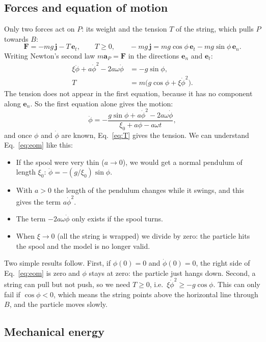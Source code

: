 \documentclass[11pt,a4paper]{article}
\newcommand{\dt}[1]{\dot{#1}}
\newcommand{\ddt}[1]{\ddot{#1}}
\newcommand{\en}{\bm{e}_n}
\newcommand{\et}{\bm{e}_t}
\begin{document}
\subsection{Forces and equation of motion}
Only two forces act on $P$: its weight and the tension $T$ of the string, which pulls $P$ towards $B$:
\begin{equation}
\bm F=-mg\,\bm j-T\,\et,\qquad T\geq0,\qquad -mg\,\bm j=mg\cos\phi\,\et-mg\sin\phi\,\en .
\label{eq:forces}
\end{equation}
Writing Newton's second law $m\bm a_P=\bm F$ in the directions $\en$ and $\et$:
\begin{align}
\xi\ddot{\phi}+a\dt{\phi}^{2}-2a\omega\dt{\phi}&=-g\sin\phi ,\label{eq:eomn}\\
T&=m\big(g\cos\phi+\xi\dt{\phi}^{2}\big).\label{eq:T}
\end{align}
The tension does not appear in the first equation, because it has no component along $\en$. So the first equation alone gives the motion:
\begin{equation}
\ddot{\phi}=-\frac{g\sin\phi+a\dt{\phi}^{2}-2a\omega\dt{\phi}}{\xi_0+a\phi-a\omega t},
\label{eq:eom}
\end{equation}
and once $\phi$ and $\dt\phi$ are known, Eq.~\eqref{eq:T} gives the tension. We can understand Eq.~\eqref{eq:eom} like this:
\begin{itemize}[noitemsep,topsep=2pt]
\item If the spool were very thin ($a\to0$), we would get a normal pendulum of length $\xi_0$: $\ddt\phi=-(g/\xi_0)\sin\phi$.
\item With $a>0$ the length of the pendulum changes while it swings, and this gives the term $a\dt\phi^2$.
\item The term $-2a\omega\dt\phi$ only exists if the spool turns.
\item When $\xi\to0$ (all the string is wrapped) we divide by zero: the particle hits the spool and the model is no longer valid.
\end{itemize}
Two simple results follow. First, if $\phi(0)=0$ and $\dt\phi(0)=0$, the right side of Eq.~\eqref{eq:eom} is zero and $\phi$ stays at zero: the particle just hangs down. Second, a string can pull but not push, so we need $T\geq0$, i.e.\ $\xi\dt\phi^2\geq-g\cos\phi$. This can only fail if $\cos\phi<0$, which means the string points above the horizontal line through $B$, and the particle moves slowly.

\subsection{Mechanical energy}
\end{document}
